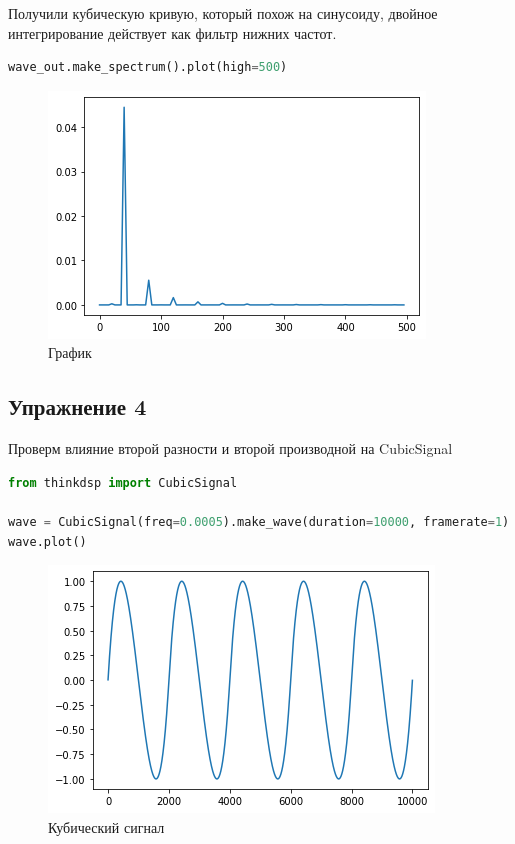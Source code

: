 Получили кубическую кривую, который похож на синусоиду, двойное интегрирование действует как фильтр нижних частот.

\begin{lstlisting}[language=Python]
wave_out.make_spectrum().plot(high=500)
\end{lstlisting}

\begin{figure}[H]
	\begin{center}
		\includegraphics[scale=1]{fig/lab09/lab09_09.png}
		\caption{График}
	\end{center}
\end{figure}


\subsection{Упражнение 4}

Проверм влияние второй разности и второй производной на CubicSignal

\begin{lstlisting}[language=Python]
from thinkdsp import CubicSignal

wave = CubicSignal(freq=0.0005).make_wave(duration=10000, framerate=1)
wave.plot()
\end{lstlisting}

\begin{figure}[H]
	\begin{center}
		\includegraphics[scale=1]{fig/lab09/lab09_10.png}
		\caption{Кубический сигнал}
	\end{center}
\end{figure}


